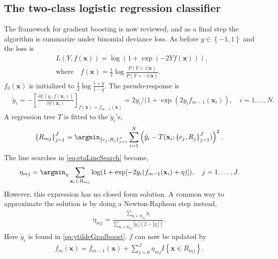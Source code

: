 \subsection{The two-class logistic regression classifier}
\label{sub:The two-class logistic regression classifier}
The framework for gradient boosting is now reviewed, and as a final step the algorithm is summarize under binomial deviance loss. As before $y \in \left\{ -1, 1 \right\}$ and the loss is 
\begin{align}
  &L(Y, f(\mathbf{x})) = \log (1 + \exp (-2 Y f(\mathbf{x}))),\\
  &\text{where} \quad f(\mathbf{x}) = \frac{1}{2} \log \frac{ P(Y = 1 | \mathbf{x})}{ P(Y = -1 | \mathbf{x})}  .
\end{align}
$f_0(\mathbf{x})$ is initialized to $\frac{1}{2} \log \frac{1+\bar{y}}{1-\bar{y}}$.  The pseudo-response is
\begin{align}
  \label{eq:ytildeGradboost} 
  &\tilde{y}_i = 
  -\left[ \frac{\partial L(y_i, f(\mathbf{x}_i)) }{\partial f(\mathbf{x}_i)}  \right]_{f(\mathbf{x}) = f_{m-1}(\mathbf{x})}
  = 2 y_i / (1 + \exp \left( 2 y_i f_{m-1}(\mathbf{x}_i) \right), \quad i = 1, \ldots, N.
\end{align}
A regression tree $T$ is fitted to the $\tilde y_i$'s,
\begin{align}
  \left\{ R_{m j} \right\}_{j = 1}^J  = 
  \argmin_{\left\{ c_j, R_{j} \right\}_{j = 1}^J} \sum^{N}_{i=1} \left( \tilde y_i - T(\mathbf{x}_i; \left\{ c_j, R_j \right\}_{j = 1}^J) \right)^2.
\end{align}
The line searches in \eqref{eq:etaLineSearch} become,
\begin{align}
  \eta_{m j} = \argmin_\eta  \sum_{\mathbf{x}_i \in R_{m j}} \log (1 + \exp [-2 y_i (f_{m-1}(\mathbf{x}_i) + \eta) ]), \quad j = 1, \ldots, J.
\end{align}
However, this expression has no closed form solution. A common way to approximate the solution is by doing a Newton-Raphson step instead,
\begin{align}
  \eta_{m j} =  \frac{\sum_{\mathbf{x}_i \in R_{m j}} \tilde y_i}{\sum_{\mathbf{x}_i \in R_{m j}} |\tilde y_i|(2-|\tilde y_i|)}.
\end{align}
Here  $\tilde y_i$ is found in \eqref{eq:ytildeGradboost}. $f$ can now be updated by
\begin{align}
  \label{eq:gradBoostUpdateF} 
  f_m(\mathbf{x}) = f_{m-1}(\mathbf{x}) +  \sum^{J}_{j=0} \eta_{m j} I\left\{ \mathbf{x} \in R_{m j} \right\}.
\end{align}
